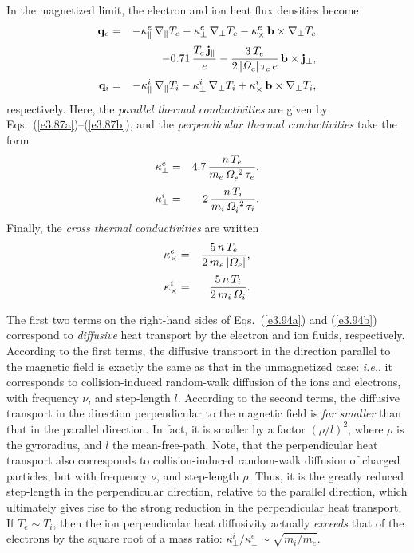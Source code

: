 In the magnetized limit, the electron and ion heat flux densities become
\begin{eqnarray}
{\bf q}_e &=& -\kappa_\parallel^e\,\nabla_\parallel T_e -\kappa_\perp^e\,
\nabla_\perp T_e
-\kappa_\times^e\,{\bf b}\times\nabla_\perp T_e\nonumber\\[0.5ex]
&&- 0.71\,\frac{T_e\,{\bf j}_\parallel}{e}-
\frac{3\,T_e}{2\,|{\mit\Omega}_e|\,\tau_e\,e}\,{\bf b}\times{\bf j}_\perp,\label{e3.94a}\\[0.5ex]
{\bf q}_i &=& -\kappa_\parallel^i\,\nabla_\parallel T_i -\kappa_\perp^i\,
\nabla_\perp T_i
+\kappa_\times^i\,{\bf b}\times\nabla_\perp T_i,\label{e3.94b}
\end{eqnarray}
respectively. Here, the {\em parallel thermal conductivities}\/ are 
given by Eqs.~(\ref{e3.87a})--(\ref{e3.87b}), and
the {\em perpendicular thermal conductivities}\/ take the form
\begin{eqnarray}
\kappa_\perp^e &=& 4.7\,\frac{n\,T_e}{m_e\,{\mit\Omega}_e^{~2}\,\tau_e},\\[0.5ex]
\kappa_\perp^i &=& 2\, \frac{n\,T_i}{m_i\,{\mit\Omega}_i^{~2}\,\tau_i}.
\end{eqnarray}
Finally, the {\em cross thermal conductivities}\/ are written
\begin{eqnarray}
\kappa_\times^e &=& \frac{5\,n\,T_e}{2\,m_e\,|{\mit\Omega}_e|},\\[0.5ex]
\kappa_\times^i &=&\frac{5\,n\,T_i}{2\,m_i\,{\mit\Omega}_i}.
\end{eqnarray}

The first two terms on the right-hand sides of Eqs.~(\ref{e3.94a}) and (\ref{e3.94b})
correspond to {\em diffusive}\/ heat transport by the electron and ion
fluids, respectively. According to the first terms, the diffusive transport in
the direction parallel to the magnetic field is exactly the same as that in the
unmagnetized case: {\em i.e.}, it corresponds to 
collision-induced random-walk diffusion
of the ions and electrons, with
frequency $\nu$, and step-length $l$. According to the
second terms, the diffusive transport in the direction perpendicular to the
magnetic field is {\em far smaller}\/ than that in the parallel direction.
In fact, it is smaller by a factor $(\rho/l)^2$, where $\rho$ is the
gyroradius, and $l$ the mean-free-path. Note, that the perpendicular
heat transport also corresponds to collision-induced random-walk diffusion
of charged particles,
but  with frequency $\nu$, and
step-length $\rho$. Thus, it is the greatly reduced step-length in the
perpendicular direction, relative to the parallel direction, which ultimately
gives rise to the strong reduction in the perpendicular heat transport. 
If $T_e\sim T_i$, then the ion perpendicular heat diffusivity actually
{\em exceeds}\/ that of the electrons by the square root of a mass ratio:
$\kappa_\perp^i/\kappa_\perp^e\sim \sqrt{m_i/m_e}$. 

